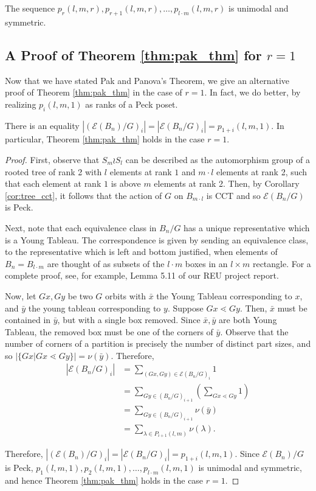 \documentclass[smallextended]{svjour3}       %
\numberwithin{equation}{section}
\newcommand\ssec{\subsection}
\begin{document}
\begin{theorem}
\label{thm:pak_thm}
\cite[Theorem 1.1]{pak}
The sequence $p_r(l,m,r), p_{r+1}(l,m,r),\ldots, p_{l\cdot m}(l,m,r)$ is unimodal and symmetric.
\end{theorem}

\ssec{A Proof of Theorem \ref{thm:pak_thm} for $r = 1$}
Now that we have stated Pak and Panova's Theorem, we give an alternative proof of Theorem \ref{thm:pak_thm} in the case of $r=1$. In fact, we do better, by realizing $p_i(l,m,1)$ as ranks of a Peck poset.

\begin{proposition}
\label{prop:rank_gen_fn_wreath_1}
There is an equality $|(\mathcal E(B_n)/G)_i| = |\mathcal E(B_n/G)_i| = p_{1+i}(l,m,1)$. In particular, Theorem \ref{thm:pak_thm} holds in the case $r = 1$.
\end{proposition}
\begin{proof}

First, observe that $S_m \wr S_l$ can be described as the automorphism group of a rooted tree of rank 2 with $l$ elements at rank $1$ and $m\cdot l$ elements at rank 2, such that each element at rank $1$ is above $m$ elements at rank 2. Then, by Corollary \ref{cor:tree_cct}, it follows that the action of $G$ on $B_{m \cdot l}$ is CCT and so $\mathcal E(B_n/G)$ is Peck.

Next, note that each equivalence class in $B_n/G$ has a unique representative which is a Young Tableau. The correspondence is given by sending an equivalence class, to the representative which is left and bottom justified, when elements of $B_n = B_{l \cdot m}$ are thought of as subsets of the $l \cdot m$ boxes in an $l \times m$ rectangle. For a complete proof, see, for example, Lemma 5.11 of our REU project report.

Now, let $Gx,Gy$ be two $G$ orbits with $\bar x$ the Young Tableau corresponding to $x$, and $\bar y$ the young tableau corresponding to $y$. Suppose $Gx \lessdot Gy$. Then, $\bar x$ must be contained in $\bar y$, but with a single box removed. Since $\bar x,\bar y$ are both Young Tableau, the removed box must be one of the corners of $\bar y$. Observe that the number of corners of a partition is precisely the number of distinct part sizes, and so $|\{Gx|Gx \lessdot Gy\}| = \nu(\bar y)$. Therefore,
\begin{align*}
  |\mathcal E(B_n/G)_i| &= \sum_{(Gx,Gy) \in \mathcal E(B_n/G)_i} 1 
  \\
  &= \sum_{Gy \in (B_n/G)_{i+1}} \left(\sum_{Gx \lessdot Gy}^{} 1 \right) 
  \\
  &= \sum_{Gy \in (B_n/G)_{i+1}}\nu(\bar y) 
  \\
  &=  \sum_{\lambda \in P_{i+1}(l,m)} \nu(\lambda).
\end{align*}

Therefore, $|(\mathcal E(B_n)/G)_i| = |\mathcal E(B_n/G)_i| = p_{1+i}(l,m,1)$. Since $\mathcal E(B_n)/G$ is Peck,
\linebreak
$p_1(l,m,1), p_{2}(l,m,1),\ldots, p_{l\cdot m}(l,m,1)$ is unimodal and symmetric, and hence Theorem \ref{thm:pak_thm} holds in the case $r = 1$.
\end{proof}
\end{document}
